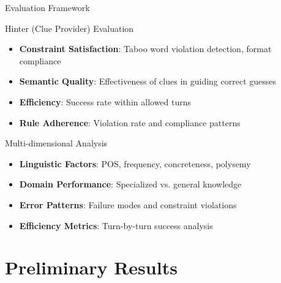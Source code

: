 \documentclass[aspectratio=169]{beamer}
\begin{document}
\begin{frame}{Evaluation Framework}
\begin{block}{Hinter (Clue Provider) Evaluation}
\begin{itemize}
    \item \textbf{Constraint Satisfaction}: Taboo word violation detection, format compliance
    \item \textbf{Semantic Quality}: Effectiveness of clues in guiding correct guesses
    \item \textbf{Efficiency}: Success rate within allowed turns
    \item \textbf{Rule Adherence}: Violation rate and compliance patterns
\end{itemize}
\end{block}

\begin{block}{Multi-dimensional Analysis}
\begin{itemize}
    \item \textbf{Linguistic Factors}: POS, frequency, concreteness, polysemy
    \item \textbf{Domain Performance}: Specialized vs. general knowledge
    \item \textbf{Error Patterns}: Failure modes and constraint violations
    \item \textbf{Efficiency Metrics}: Turn-by-turn success analysis
\end{itemize}
\end{block}
\end{frame}

\section{Preliminary Results}
\end{document}
